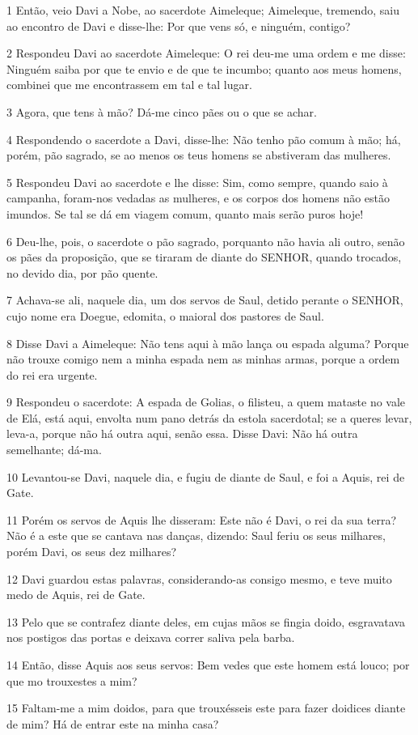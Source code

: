 \par 1 Então, veio Davi a Nobe, ao sacerdote Aimeleque; Aimeleque, tremendo, saiu ao encontro de Davi e disse-lhe: Por que vens só, e ninguém, contigo?
\par 2 Respondeu Davi ao sacerdote Aimeleque: O rei deu-me uma ordem e me disse: Ninguém saiba por que te envio e de que te incumbo; quanto aos meus homens, combinei que me encontrassem em tal e tal lugar.
\par 3 Agora, que tens à mão? Dá-me cinco pães ou o que se achar.
\par 4 Respondendo o sacerdote a Davi, disse-lhe: Não tenho pão comum à mão; há, porém, pão sagrado, se ao menos os teus homens se abstiveram das mulheres.
\par 5 Respondeu Davi ao sacerdote e lhe disse: Sim, como sempre, quando saio à campanha, foram-nos vedadas as mulheres, e os corpos dos homens não estão imundos. Se tal se dá em viagem comum, quanto mais serão puros hoje!
\par 6 Deu-lhe, pois, o sacerdote o pão sagrado, porquanto não havia ali outro, senão os pães da proposição, que se tiraram de diante do SENHOR, quando trocados, no devido dia, por pão quente.
\par 7 Achava-se ali, naquele dia, um dos servos de Saul, detido perante o SENHOR, cujo nome era Doegue, edomita, o maioral dos pastores de Saul.
\par 8 Disse Davi a Aimeleque: Não tens aqui à mão lança ou espada alguma? Porque não trouxe comigo nem a minha espada nem as minhas armas, porque a ordem do rei era urgente.
\par 9 Respondeu o sacerdote: A espada de Golias, o filisteu, a quem mataste no vale de Elá, está aqui, envolta num pano detrás da estola sacerdotal; se a queres levar, leva-a, porque não há outra aqui, senão essa. Disse Davi: Não há outra semelhante; dá-ma.
\par 10 Levantou-se Davi, naquele dia, e fugiu de diante de Saul, e foi a Aquis, rei de Gate.
\par 11 Porém os servos de Aquis lhe disseram: Este não é Davi, o rei da sua terra? Não é a este que se cantava nas danças, dizendo: Saul feriu os seus milhares, porém Davi, os seus dez milhares?
\par 12 Davi guardou estas palavras, considerando-as consigo mesmo, e teve muito medo de Aquis, rei de Gate.
\par 13 Pelo que se contrafez diante deles, em cujas mãos se fingia doido, esgravatava nos postigos das portas e deixava correr saliva pela barba.
\par 14 Então, disse Aquis aos seus servos: Bem vedes que este homem está louco; por que mo trouxestes a mim?
\par 15 Faltam-me a mim doidos, para que trouxésseis este para fazer doidices diante de mim? Há de entrar este na minha casa?

